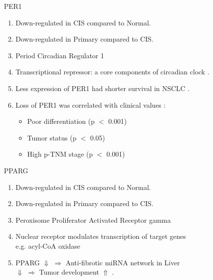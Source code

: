 \documentclass{beamer}
\begin{document}
\begin{frame}[allowframebreaks]
        \begin{block}{PER1}
            \begin{enumerate}
                \item Down-regulated in CIS compared to Normal.
                \item Down-regulated in Primary compared to CIS.
                \item Period Circadian Regulator 1
                \item Transcriptional repressor: a core components of circadian clock \cite{PER1-1}.
                \item Less expression of PER1 had shorter survival in NSCLC \cite{PER1-2}.
                \item Loss of PER1 was correlated with clinical values \cite{PER1-3}:
                \begin{itemize}
                    \item Poor differentiation (p $<$ 0.001)
                    \item Tumor status (p $<$ 0.05)
                    \item High p-TNM stage (p $<$ 0.001)
                \end{itemize}
            \end{enumerate}
        \end{block}

        \begin{block}{PPARG}
            \begin{enumerate}
                \item Down-regulated in CIS compared to Normal.
                \item Down-regulated in Primary compared to CIS.
                \item Peroxisome Proliferator Activated Receptor gamma
                \item Nuclear receptor modulates transcription of target genes \cite{PPARG-1} \\
                    e.g. acyl-CoA oxidase
                \item PPARG $\Downarrow$ $\Rightarrow$ Anti-fibrotic miRNA network in Liver \\
                    $\Downarrow$ $\Rightarrow$ Tumor development $\Uparrow$ \cite{PPARG-2}.
            \end{enumerate}
        \end{block}


\end{frame}
\end{document}

